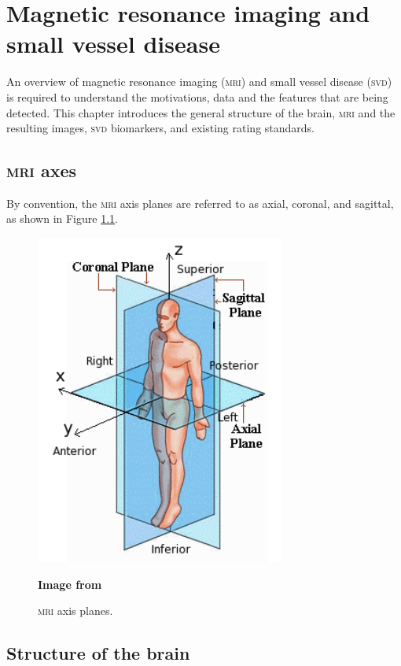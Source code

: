 




\chapter{Magnetic resonance imaging and small vessel disease}\label{mri_svd_intro}

An overview of magnetic resonance imaging (\textsc{mri}) and small vessel disease (\textsc{svd}) is required to understand the motivations, data and the features that are being detected. This chapter introduces the general structure of the brain, \textsc{mri} and the resulting images, \textsc{svd} biomarkers, and existing rating standards.

\section{\textsc{mri} axes}

By convention, the \textsc{mri} axis planes are referred to as axial, coronal, and sagittal, as shown in Figure \ref{svd-axes}.

\begin{figure}[ht]
	\centering
	\includegraphics[scale=0.8]{Images/2_axes.png}
	\caption{\textsc{mri} axis planes.}
	\small \textbf{Image from}
	\label{svd-axes}
\end{figure}

\section{Structure of the brain}\label{svd-brain}

